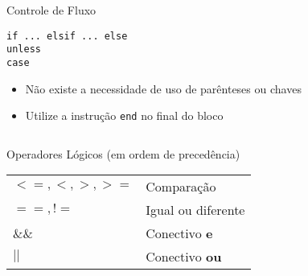 \begin{frame}{Controle de Fluxo}
  \begin{center}
    \Large \verb!if ... elsif ... else! \\ \verb!unless! \\ \verb!case! 
  \end{center}   
\framebreak
  \begin{itemize}
    \item \alert{Não} existe a necessidade de uso de \alert{parênteses} ou \alert{chaves}
    \item \alert{Utilize} a instrução \verb!end! no final do bloco
  \end{itemize}   
  \begin{columns}
    \begin{column}{0.5\textwidth}
    		  
    \end{column}
    \begin{column}{0.5\textwidth}
    		  
    \end{column}
  \end{columns}
\framebreak
    		  
\framebreak
    		  
\end{frame}
\begin{frame}[fragile,t]{Operadores Lógicos (em ordem de precedência)}
	\begin{table}[tp] 	
		\setlength{\tabcolsep}{8pt}
    \setlength{\extrarowheight}{2pt}    
		\begin{tabular}{p{2.5cm}l}
    	\toprule
      $<=, <, >, >=$ &  Comparação\\
      $==, !=$ & Igual ou diferente  \\
      $\&\&$ &  Conectivo \textbf{e} \\
      $||$ & Conectivo \textbf{ou} \\
	    \bottomrule
		\end{tabular}
	\end{table}   
\end{frame}
